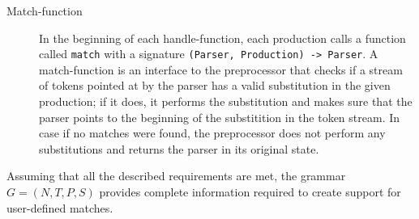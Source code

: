 \begin{description}
    \item[Match-function] In the beginning of each handle-function, each
    production calls a function called \verb|match| with a signature
    \verb/(Parser, Production) -> Parser/.  A match-function is an
    interface to the preprocessor that checks if a stream of tokens
    pointed at by the parser has a valid substitution in the given
    production; if it does, it performs the substitution and makes sure
    that the parser points to the beginning of the substitition in the
    token stream.  In case if no matches were found, the preprocessor
    does not perform any substitutions and returns the parser in its
    original state.
\end{description}

Assuming that all the described requirements are met, the grammar 
$G = (N, T, P, S)$ provides complete information required to create 
support for user-defined matches.

